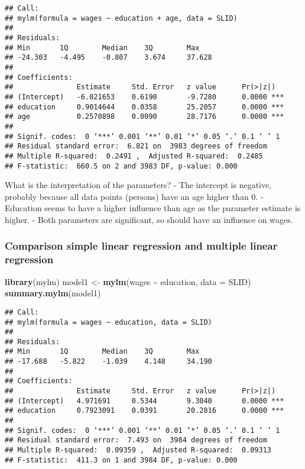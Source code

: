 \documentclass[
]{article}
\newenvironment{Shaded}{\begin{snugshade}}{\end{snugshade}}
\newcommand{\AttributeTok}[1]{\textcolor[rgb]{0.13,0.29,0.53}{#1}}
\newcommand{\FunctionTok}[1]{\textcolor[rgb]{0.13,0.29,0.53}{\textbf{#1}}}
\newcommand{\NormalTok}[1]{#1}
\newcommand{\OtherTok}[1]{\textcolor[rgb]{0.56,0.35,0.01}{#1}}
\newcommand{\SpecialCharTok}[1]{\textcolor[rgb]{0.81,0.36,0.00}{\textbf{#1}}}
\begin{document}
\begin{verbatim}
## Call:
## mylm(formula = wages ~ education + age, data = SLID)
## 
## Residuals:
## Min       1Q        Median    3Q        Max       
## -24.303   -4.495    -0.807    3.674     37.628    
## 
## Coefficients:
##               Estimate     Std. Error   z value      Pr(>|z|)     
## (Intercept)   -6.021653    0.6190       -9.7280      0.0000 ***   
## education     0.9014644    0.0358       25.2057      0.0000 ***   
## age           0.2570898    0.0090       28.7176      0.0000 ***   
## 
## Signif. codes:  0 ‘***’ 0.001 ‘**’ 0.01 ‘*’ 0.05 ‘.’ 0.1 ‘ ’ 1
## Residual standard error:  6.821 on  3983 degrees of freedom 
## Multiple R-squared:  0.2491 ,  Adjusted R-squared:  0.2485 
## F-statistic:  660.5 on 2 and 3983 DF, p-value: 0.000
\end{verbatim}

What is the interpretation of the parameters? - The intercept is
negative, probably because all data points (persons) have an age higher
than 0. - Education seems to have a higher influence than age as the
parameter estimate is higher. - Both parameters are significant, so
should have an influence on wages.

\hypertarget{comparison-simple-linear-regression-and-multiple-linear-regression}{%
\subsubsection{Comparison simple linear regression and multiple linear
regression}\label{comparison-simple-linear-regression-and-multiple-linear-regression}}

\begin{Shaded}
\begin{Highlighting}[]
\FunctionTok{library}\NormalTok{(mylm)}
\NormalTok{model1 }\OtherTok{\textless{}{-}} \FunctionTok{mylm}\NormalTok{(wages }\SpecialCharTok{\textasciitilde{}}\NormalTok{ education, }\AttributeTok{data =}\NormalTok{ SLID)}
\FunctionTok{summary.mylm}\NormalTok{(model1)}
\end{Highlighting}
\end{Shaded}

\begin{verbatim}
## Call:
## mylm(formula = wages ~ education, data = SLID)
## 
## Residuals:
## Min       1Q        Median    3Q        Max       
## -17.688   -5.822    -1.039    4.148     34.190    
## 
## Coefficients:
##               Estimate     Std. Error   z value      Pr(>|z|)     
## (Intercept)   4.971691     0.5344       9.3040       0.0000 ***   
## education     0.7923091    0.0391       20.2816      0.0000 ***   
## 
## Signif. codes:  0 ‘***’ 0.001 ‘**’ 0.01 ‘*’ 0.05 ‘.’ 0.1 ‘ ’ 1
## Residual standard error:  7.493 on  3984 degrees of freedom 
## Multiple R-squared:  0.09359 ,  Adjusted R-squared:  0.09313 
## F-statistic:  411.3 on 1 and 3984 DF, p-value: 0.000
\end{verbatim}
\end{document}

